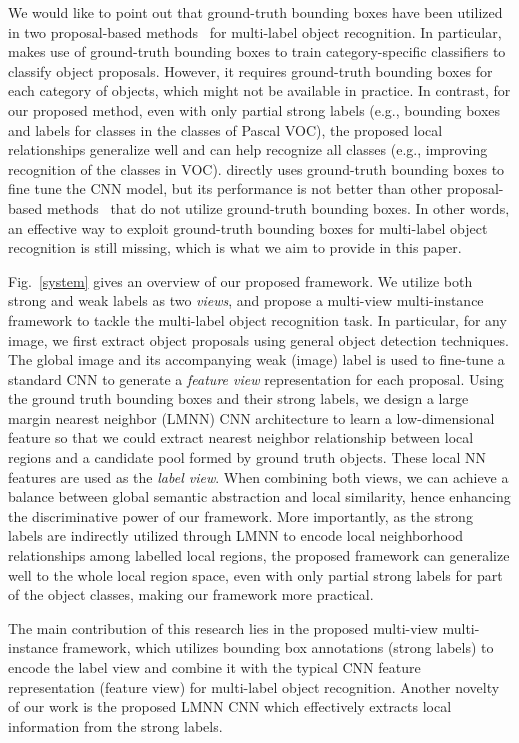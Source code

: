 \documentclass[10pt,twocolumn,letterpaper]{article}
\begin{document}
We would like to point out that ground-truth bounding boxes have been utilized in two proposal-based methods~\cite{OquabCVPR2014,girshick2014} for multi-label object recognition. In particular,~\cite{girshick2014} makes use of ground-truth bounding boxes to train category-specific classifiers to classify object proposals. However, it requires ground-truth bounding boxes for each category of objects, which might not be available in practice. In contrast, for our proposed method, even with only partial
strong labels (e.g., bounding boxes and labels for  classes in
the  classes of Pascal VOC), the proposed local relationships
generalize well and can help recognize all classes (e.g., improving
recognition of the  classes in VOC). \cite{OquabCVPR2014} directly uses ground-truth bounding boxes to fine tune the CNN model, but its performance is not better than other proposal-based methods~\cite{Oquab2014,Wei2014} that do not utilize ground-truth bounding boxes. In other words, an effective way to exploit ground-truth bounding boxes for multi-label object recognition is still missing, which is what we aim to provide in this paper.

Fig.~\ref{system} gives an overview of our proposed framework. We
utilize both strong and weak labels as two \emph{views}, and
propose a multi-view multi-instance framework to tackle the
multi-label object recognition task. In particular, for any image, we first
extract object proposals using general object detection
techniques. The global image and its accompanying weak (image)
label is used to fine-tune a standard CNN to generate a \emph{feature view}
representation for each proposal. Using the ground truth bounding
boxes and their strong labels, we design a large margin nearest neighbor
(LMNN) CNN architecture to learn a low-dimensional feature so that
we could extract nearest neighbor relationship between local
regions and a candidate pool formed by ground truth objects. These
local NN features are used as the \emph{label view}. When
combining both views, we can achieve a balance between global
semantic abstraction and local similarity, hence enhancing the
discriminative power of our framework. More importantly, as the
strong labels are indirectly utilized through LMNN to encode local
neighborhood relationships among labelled local regions, the
proposed framework can generalize well to the whole local region
space, even with only partial strong labels for part of the object
classes, making our framework more practical.

The main contribution of this research lies in the proposed multi-view multi-instance framework, which utilizes bounding box annotations (strong labels) to encode the label view and combine it with the typical CNN feature representation (feature view) for multi-label object recognition. Another novelty of our work is the proposed LMNN CNN which effectively extracts local information from the strong labels.
\end{document}
